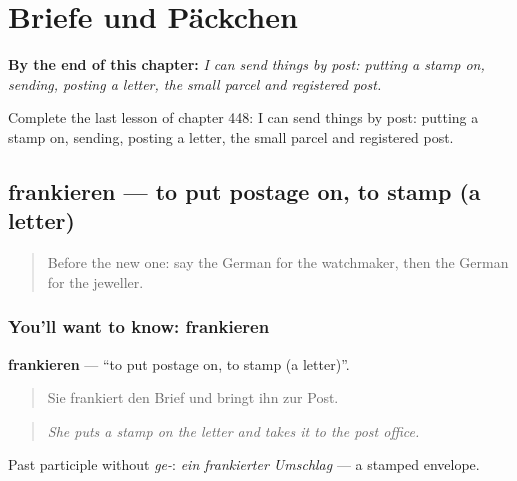 
\chapter{Briefe und Päckchen}
\label{ch:ge-briefe-und-packchen}

\begin{chapteropening}
\textbf{By the end of this chapter:} \emph{I can send things by post: putting a stamp on, sending, posting a letter, the small parcel and registered post.}

Complete the last lesson of chapter 448: I can send things by post: putting a stamp on, sending, posting a letter, the small parcel and registered post.
\end{chapteropening}

\section[frankieren]{frankieren — to put postage on, to stamp (a letter)}

\label{lesson:GE-C448-frankieren}



\begin{quote}
Before the new one: say the German for the watchmaker, then the German for the jeweller.
\end{quote}

\subsection*{You'll want to know: frankieren}
\textbf{frankieren} — \textquotedblleft{}to put postage on, to stamp (a letter)\textquotedblright{}.

\begin{quote}
Sie frankiert den Brief und bringt ihn zur Post.
\end{quote}

\begin{quote}
\emph{She puts a stamp on the letter and takes it to the post office.}
\end{quote}

Past participle without \emph{ge-}: \emph{ein frankierter Umschlag} — a stamped envelope.

